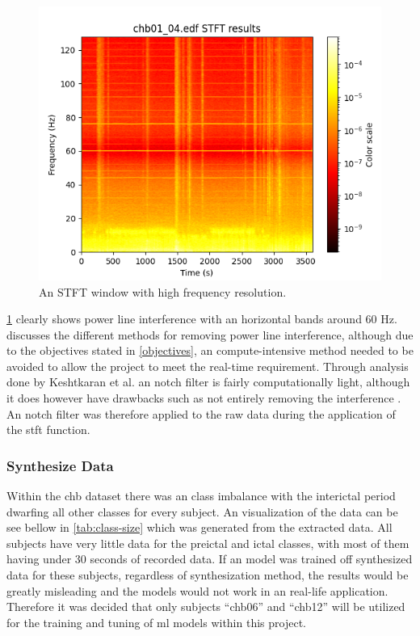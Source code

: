 \documentclass[12pt]{article}
\begin{document}
\begin{figure}[H]
\includegraphics[width=\textwidth]{stft1}
\centering
\caption{An STFT window with high frequency resolution.}
\label{fig:stft1}
\end{figure}

\ref{fig:stft1} clearly shows power line interference with an horizontal bands around 60 Hz. \cite{keshtkaran2014fast} discusses the different methods for removing power line interference, although due to the objectives stated in \ref{objectives}, an compute-intensive method needed to be avoided to allow the project to meet the real-time requirement. Through analysis done by Keshtkaran et al. an notch filter is fairly computationally light, although it does however have drawbacks such as not entirely removing the interference \cite{keshtkaran2014fast}. An notch filter was therefore applied to the raw data during the application of the \acrshort{stft} function.


\subsubsection{Synthesize Data}\label{synthesize-data}

Within the \acrshort{chb} dataset there was an class imbalance with the interictal period dwarfing all other classes for every subject. An visualization of the data can be see bellow in \ref{tab:class-size} which was generated from the extracted data. All subjects have very little data for the preictal and ictal classes, with most of them having under 30 seconds of recorded data. If an model was trained off synthesized data for these subjects, regardless of synthesization method, the results would be greatly misleading and the models would not work in an real-life application. Therefore it was decided that only subjects ``chb06'' and ``chb12'' will be utilized for the training and tuning of \acrshort{ml} models within this project. 
\end{document}
